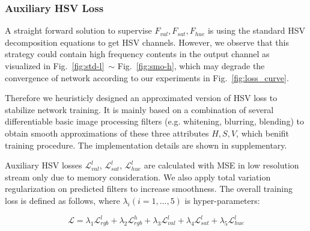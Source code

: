 \documentclass[runningheads]{llncs}
\begin{document}
    \subsubsection{Auxiliary HSV Loss} \label{section:smooth}
    


    


    A straight forward solution to supervise $F_{val}, F_{sat}, F_{hue}$ is using the standard HSV decomposition equations to get HSV channels. However, we observe that this strategy could contain high frequency contents in the output channel as visualized in Fig.~\ref{fig:std-l}~$\sim$ Fig.~\ref{fig:smo-h}, which may degrade the convergence of network according to our experiments in Fig.~\ref{fig:loss_curve}.
    
    Therefore we heuristicly designed an approximated version of HSV loss to stabilize network training. 
    It is mainly based on a combination of several differentiable basic image processing filters (e.g. whitening, blurring, blending) to obtain smooth approximations of these three attributes $H,S,V$, which benifit training procedure.
    The implementation details are shown in supplementary.


    
    Auxiliary HSV losses $\mathcal{L}_{val}^{l}$, $\mathcal{L}_{sat}^{l}$, $\mathcal{L}_{hue}^{l}$ are calculated with MSE in low resolution stream only due to memory consideration. 
    We also apply total variation regularization on predicted filters to increase smoothness.
    The overall training loss is defined as follows, where $\lambda_i (i=1,...,5)$ is hyper-parameters:






    \begin{equation} \label{eq:eq_loss}
        \mathcal{L} = \lambda_1 \mathcal{L}_{rgb}^{l} + \lambda_2 \mathcal{L}_{rgb}^{h} + \lambda_3 \mathcal{L}_{val}^l + \lambda_4 \mathcal{L}_{sat}^l + \lambda_5 \mathcal{L}_{hue}^l
    \end{equation}
    
\end{document}
